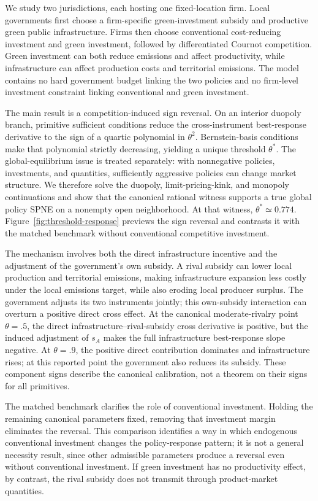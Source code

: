 We study two jurisdictions, each hosting one fixed-location firm. Local governments first choose a firm-specific green-investment subsidy and productive green public infrastructure. Firms then choose conventional cost-reducing investment and green investment, followed by differentiated Cournot competition. Green investment can both reduce emissions and affect productivity, while infrastructure can affect production costs and territorial emissions. The model contains no hard government budget linking the two policies and no firm-level investment constraint linking conventional and green investment.

The main result is a competition-induced sign reversal. On an interior duopoly branch, primitive sufficient conditions reduce the cross-instrument best-response derivative to the sign of a quartic polynomial in $\theta^2$. Bernstein-basis conditions make that polynomial strictly decreasing, yielding a unique threshold $\theta^*$. The global-equilibrium issue is treated separately: with nonnegative policies, investments, and quantities, sufficiently aggressive policies can change market structure. We therefore solve the duopoly, limit-pricing-kink, and monopoly continuations and show that the canonical rational witness supports a true global policy SPNE on a nonempty open neighborhood. At that witness, $\theta^*\simeq0.774$.
Figure~\ref{fig:threshold-response} previews the sign reversal and contrasts it with the matched benchmark without conventional competitive investment.

The mechanism involves both the direct infrastructure incentive and the adjustment of the government's own subsidy. A rival subsidy can lower local production and territorial emissions, making infrastructure expansion less costly under the local emissions target, while also eroding local producer surplus. The government adjusts its two instruments jointly; this own-subsidy interaction can overturn a positive direct cross effect. At the canonical moderate-rivalry point $\theta=.5$, the direct infrastructure--rival-subsidy cross derivative is positive, but the induced adjustment of $s_A$ makes the full infrastructure best-response slope negative. At $\theta=.9$, the positive direct contribution dominates and infrastructure rises; at this reported point the government also reduces its subsidy. These component signs describe the canonical calibration, not a theorem on their signs for all primitives.

The matched benchmark clarifies the role of conventional investment. Holding the remaining canonical parameters fixed, removing that investment margin eliminates the reversal. This comparison identifies a way in which endogenous conventional investment changes the policy-response pattern; it is not a general necessity result, since other admissible parameters produce a reversal even without conventional investment. If green investment has no productivity effect, by contrast, the rival subsidy does not transmit through product-market quantities.

